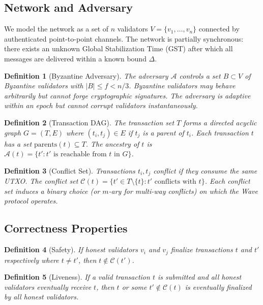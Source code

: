 \documentclass[11pt,a4paper]{article}
\newtheorem{definition}{Definition}[section]
\begin{document}
\subsection{Network and Adversary}

We model the network as a set of $n$ validators $V = \{v_1, \ldots, v_n\}$ connected
by authenticated point-to-point channels. The network is partially synchronous: there
exists an unknown Global Stabilization Time (GST) after which all messages are delivered
within a known bound $\Delta$.

\begin{definition}[Byzantine Adversary]
The adversary $\mathcal{A}$ controls a set $B \subset V$ of Byzantine validators with
$|B| \leq f < n/3$. Byzantine validators may behave arbitrarily but cannot forge
cryptographic signatures. The adversary is adaptive within an epoch but cannot corrupt
validators instantaneously.
\end{definition}

\begin{definition}[Transaction DAG]
\label{def:dag}
The transaction set $T$ forms a directed acyclic graph $G = (T, E)$ where $(t_i, t_j) \in E$
if $t_j$ is a parent of $t_i$. Each transaction $t$ has a set $\text{parents}(t) \subseteq T$.
The ancestry of $t$ is $\mathcal{A}(t) = \{t' : t' \text{ is reachable from } t \text{ in } G\}$.
\end{definition}

\begin{definition}[Conflict Set]
Transactions $t_i, t_j$ conflict if they consume the same UTXO. The conflict set
$\mathcal{C}(t) = \{t' \in T \setminus \{t\} : t' \text{ conflicts with } t\}$.
Each conflict set induces a binary choice (or $m$-ary for multi-way conflicts) on which
the Wave protocol operates.
\end{definition}

\subsection{Correctness Properties}

\begin{definition}[Safety]
If honest validators $v_i$ and $v_j$ finalize transactions $t$ and $t'$ respectively
where $t \neq t'$, then $t \notin \mathcal{C}(t')$.
\end{definition}

\begin{definition}[Liveness]
If a valid transaction $t$ is submitted and all honest validators eventually receive $t$,
then $t$ or some $t' \notin \mathcal{C}(t)$ is eventually finalized by all honest validators.
\end{definition}
\end{document}
